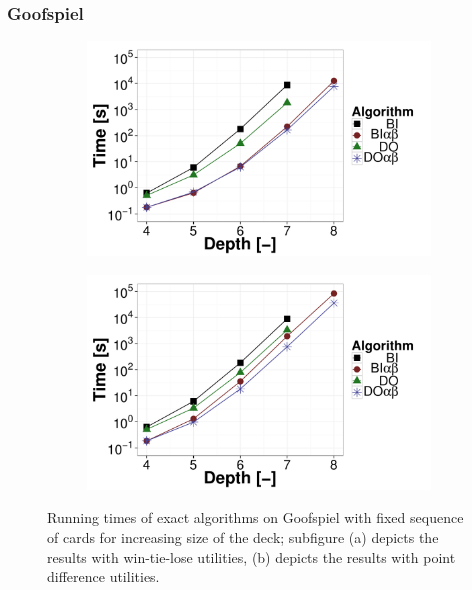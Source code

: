 \subsubsection{Goofspiel}
\begin{figure}[t!]
\centering
	\begin{subfigure}{0.49\textwidth}
 		\includegraphics[width=1\textwidth]{figures/GS-BT-NF.pdf}\caption{}\label{fig:off:res:gs-bt}
 	\end{subfigure}
	\begin{subfigure}{0.49\textwidth}
 		\includegraphics[width=1\textwidth]{figures/GS-BF-NF.pdf}\caption{}\label{fig:off:res:gs-bf}
 	\end{subfigure}
\caption{Running times of exact algorithms on Goofspiel with fixed sequence of cards for increasing size of the deck; subfigure (a) depicts the results with win-tie-lose utilities, (b) depicts the results with point difference utilities.} \label{fig:off:res:gs}
\end{figure}

